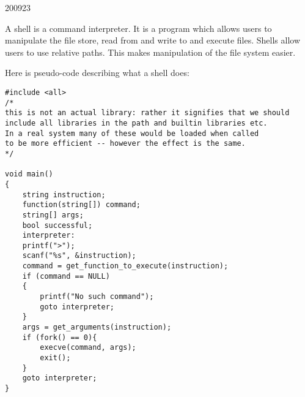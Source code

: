\documentclass[10pt,\jkfside,a4paper]{article}
\begin{document}
\begin{examquestion}{2009}{2}{3}
\begin{enumerate}
\begin{enumerate}
A shell is a command interpreter. It is a program which allows users to manipulate the 
file store, read from and write to and execute files. Shells allow users to use relative 
paths. This makes manipulation of the file system easier.

Here is pseudo-code describing what a shell does:

\begin{lstlisting}[style=pseudocode]
#include <all>
/*
this is not an actual library: rather it signifies that we should 
include all libraries in the path and builtin libraries etc.
In a real system many of these would be loaded when called 
to be more efficient -- however the effect is the same.
*/

void main()
{
	string instruction;
	function(string[]) command;
	string[] args;
	bool successful;
	interpreter:
	printf(">");
	scanf("%s", &instruction);
	command = get_function_to_execute(instruction);
	if (command == NULL)
	{
		printf("No such command");
		goto interpreter;
	}
	args = get_arguments(instruction);
	if (fork() == 0){
		execve(command, args);
		exit();
	}
	goto interpreter;
}
\end{lstlisting}

\end{enumerate}

\end{enumerate}

\end{examquestion}
\end{document}
